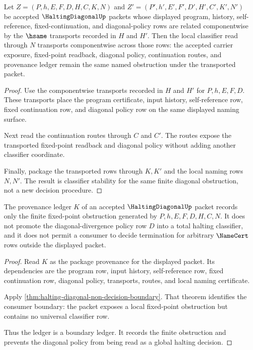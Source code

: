 \begin{theorem}\label{thm:halting-diagonal-classifier-stability-obligation}
Let $Z=(P,h,E,F,D,H,C,K,N)$ and $Z'=(P',h',E',F',D',H',C',K',N')$ be accepted $\HaltingDiagonalUp$ packets whose displayed program, history, self-reference, fixed-continuation, and diagonal-policy rows are related componentwise by the $\hsame$ transports recorded in $H$ and $H'$. Then the local classifier read through $N$ transports componentwise across those rows: the accepted carrier exposure, fixed-point readback, diagonal policy, continuation routes, and provenance ledger remain the same named obstruction under the transported packet.
\end{theorem}
\begin{proof}
Use the componentwise transports recorded in $H$ and $H'$ for $P,h,E,F,D$. These transports place the program certificate, input history, self-reference row, fixed continuation row, and diagonal policy row on the same displayed naming surface.

Next read the continuation routes through $C$ and $C'$. The routes expose the transported fixed-point readback and diagonal policy without adding another classifier coordinate.

Finally, package the transported rows through $K,K'$ and the local naming rows $N,N'$. The result is classifier stability for the same finite diagonal obstruction, not a new decision procedure.
\end{proof}

\begin{theorem}\label{thm:halting-diagonal-ledger-boundary-obligation}
The provenance ledger $K$ of an accepted $\HaltingDiagonalUp$ packet records only the finite fixed-point obstruction generated by $P,h,E,F,D,H,C,N$. It does not promote the diagonal-divergence policy row $D$ into a total halting classifier, and it does not permit a consumer to decide termination for arbitrary $\NameCert$ rows outside the displayed packet.
\end{theorem}
\begin{proof}
Read $K$ as the package provenance for the displayed packet. Its dependencies are the program row, input history, self-reference row, fixed continuation row, diagonal policy, transports, routes, and local naming certificate.

Apply \autoref{thm:halting-diagonal-non-decision-boundary}. That theorem identifies the consumer boundary: the packet exposes a local fixed-point obstruction but contains no universal classifier row.

Thus the ledger is a boundary ledger. It records the finite obstruction and prevents the diagonal policy from being read as a global halting decision.
\end{proof}

